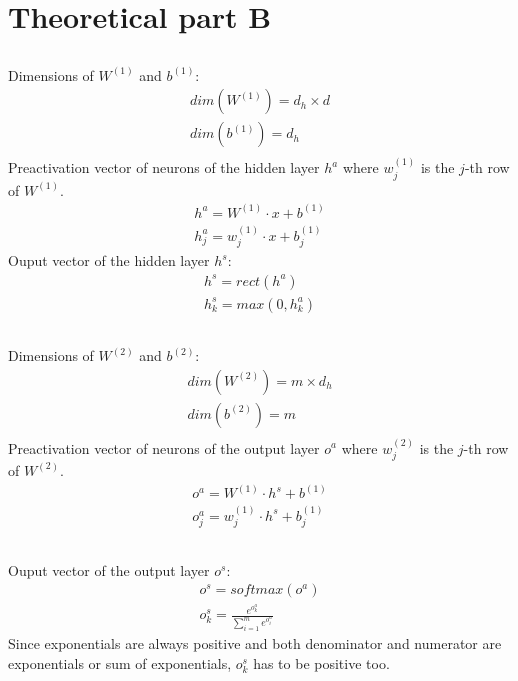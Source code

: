 \documentclass[12pt]{article}
\begin{document}
\section{Theoretical part B}
\subsection{}
Dimensions of $W^{(1)}$ and $b^{(1)}$:
\begin{align*}
dim(W^{(1)}) = d_h \times d \\
dim(b^{(1)}) = d_h \\
\end{align*}
Preactivation vector of neurons of the hidden layer $h^a$ where $w_j^{(1)}$ is the $j$-th row of $W^{(1)}$.
\begin{align*}
h^a=W^{(1)} \cdot x + b^{(1)} \\
h^a_j = w_j^{(1)} \cdot x + b^{(1)}_j
\end{align*}
Ouput vector of the hidden layer $h^s$:
\begin{align*}
h^s = rect(h^a)  \\
h^s_k = max(0,h^a_k)
\end{align*}


\subsection{}
Dimensions of $W^{(2)}$ and $b^{(2)}$:
\begin{align*}
dim(W^{(2)}) = m \times d_h \\
dim(b^{(2)}) = m \\
\end{align*}
Preactivation vector of neurons of the output layer $o^a$ where $w_j^{(2)}$ is the $j$-th row of $W^{(2)}$.
\begin{align*}
o^a=W^{(1)} \cdot h^s + b^{(1)} \\
o^a_j = w_j^{(1)} \cdot h^s + b^{(1)}_j
\end{align*}
\subsection{}
Ouput vector of the output layer $o^s$:
\begin{align*}
o^s = softmax(o^a)  \\
o^s_k = \frac{e^{o^a_k}}{\sum\limits_{i=1}^m e^{o^a_i}}
\end{align*}
Since exponentials are always positive and both denominator and numerator are exponentials or sum of exponentials, $o^s_k$ has to be positive too.
\end{document}
